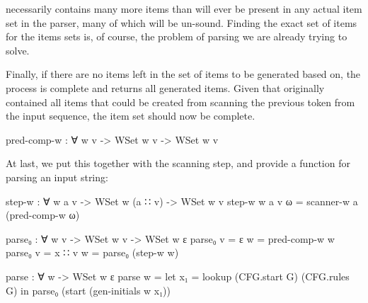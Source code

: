 		 necessarily contains many more items than will ever 
		be present in any actual item set in the parser, many of which will be 
		un-sound. Finding the exact set of items for the items sets is, of 
		course, the problem of parsing we are already trying to solve.
		
		Finally, if there are no items left in the set of items to be generated
		based on, the process is complete and  returns all
		generated items. Given that  originally contained all items 
		that could be created from scanning the previous token from the input 
		sequence, the item set should now be complete.
		
		\begin{code}
			
			pred-comp-w : ∀ {w v} -> WSet w v -> WSet w v

		\end{code}

		At last, we put this together with the scanning step, and provide a 
		function for parsing an input string:

		\begin{code}
			
			step-w : ∀ {w a v} ->
			  WSet w (a ∷ v) ->
			  WSet w v
			step-w {w} {a} {v} ω = scanner-w a (pred-comp-w ω)
			
			parse₀ : ∀ {w v} ->
			   WSet w v ->
			   WSet w ε
			parse₀ {v = ε} w = pred-comp-w w
			parse₀ {v = x ∷ v} w = parse₀ (step-w w)
			
			parse : ∀ w -> WSet w ε
			parse w =
			  let x₁ = lookup (CFG.start G) (CFG.rules G) in
			  parse₀ (start (gen-initials w x₁))
		
		\end{code}
